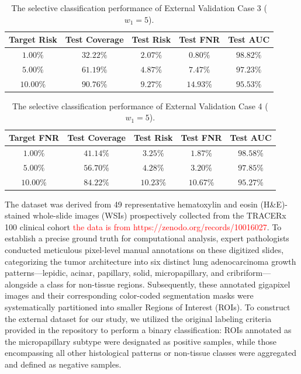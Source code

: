 \documentclass[UTF8,12pt]{article}
\begin{document}
\begin{table}[htbp]
    \centering
    \caption{The selective classification performance of External Validation Case 3 ($w_{1}=5$).}
    \label{tab:case3_results}
    \renewcommand\arraystretch{1.2} 
    \small 
    \begin{tabular}{ccccc}
        \toprule
        Target Risk & Test Coverage & Test Risk & Test FNR & Test AUC \\
        \midrule
        $1.00\%$ & $32.22\%$ & $2.07\%$ & $0.80\%$ & $98.82\%$ \\
        $5.00\%$ & $61.19\%$ & $4.87\%$ & $7.47\%$ & $97.23\%$ \\
        $10.00\%$ & $90.76\%$ & $9.27\%$ & $14.93\%$ & $95.53\%$ \\
        \bottomrule
    \end{tabular}
\end{table}
\begin{table}[htbp]
    \centering
    \caption{The selective classification performance of External Validation Case 4 ($w_{1}=5$).}
    \label{tab:case4_results}
    \renewcommand\arraystretch{1.2} 
    \small 
    \begin{tabular}{ccccc}
        \toprule
        Target FNR & Test Coverage & Test Risk & Test FNR & Test AUC \\
        \midrule
        $1.00\%$ & $41.14\%$ & $3.25\%$ & $1.87\%$ & $98.58\%$ \\
        $5.00\%$ & $56.70\%$ & $4.28\%$ & $3.20\%$ & $97.85\%$ \\
        $10.00\%$ & $84.22\%$ & $10.23\%$ & $10.67\%$ & $95.27\%$ \\
        \bottomrule
    \end{tabular}
\end{table}
The dataset was derived from 49 representative hematoxylin and eosin (H\&E)-stained whole-slide images (WSIs) prospectively collected from the TRACERx 100 clinical cohort \textcolor{red}{the data is from https://zenodo.org/records/10016027}. To establish a precise ground truth for computational analysis, expert pathologists conducted meticulous pixel-level manual annotations on these digitized slides, categorizing the tumor architecture into six distinct lung adenocarcinoma growth patterns—lepidic, acinar, papillary, solid, micropapillary, and cribriform—alongside a class for non-tissue regions. Subsequently, these annotated gigapixel images and their corresponding color-coded segmentation masks were systematically partitioned into smaller Regions of Interest (ROIs). To construct the external dataset for our study, we utilized the original labeling criteria provided in the repository to perform a binary classification: ROIs annotated as the micropapillary subtype were designated as positive samples, while those encompassing all other histological patterns or non-tissue classes were aggregated and defined as negative samples.
\end{document}
